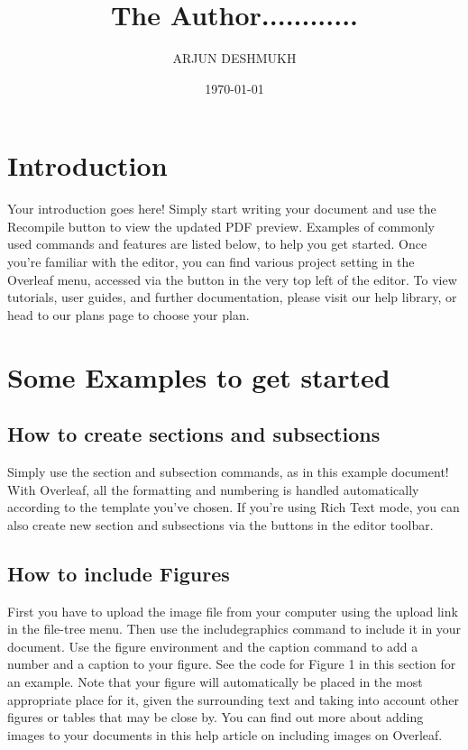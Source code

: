 \documentclass{article}
\begin{document}
\title{The Author............}
\author{ARJUN DESHMUKH}
\date{\today}
\maketitle
\section{Introduction}
Your introduction goes here! Simply start writing your document and use the Recompile button to
view the updated PDF preview. Examples of commonly used commands and features are listed below,
to help you get started.
Once you’re familiar with the editor, you can find various project setting in the Overleaf menu,
accessed via the button in the very top left of the editor. To view tutorials, user guides, and further
documentation, please visit our help library, or head to our plans page to choose your plan.
\section{Some Examples to get started}
\subsection{How to create sections and subsections}
Simply use the section and subsection commands, as in this example document! With Overleaf, all
the formatting and numbering is handled automatically according to the template you’ve chosen. If
you’re using Rich Text mode, you can also create new section and subsections via the buttons in the
editor toolbar.
\subsection{How to include Figures}
First you have to upload the image file from your computer using the upload link in the file-tree menu.
Then use the includegraphics command to include it in your document. Use the figure environment
and the caption command to add a number and a caption to your figure. See the code for Figure 1 in
this section for an example.
Note that your figure will automatically be placed in the most appropriate place for it, given the
surrounding text and taking into account other figures or tables that may be close by. You can find
out more about adding images to your documents in this help article on including images on Overleaf.
\end{document}
